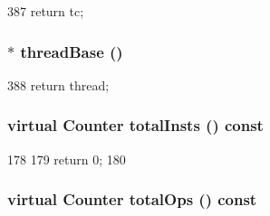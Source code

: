 \begin{DoxyCode}
387 { return tc; }
\end{DoxyCode}
\hypertarget{classCheckerCPU_aed48fbbf4ee8e6fbb3ea13b1bbc23e2d}{
\subsubsection[{threadBase}]{$\ast$ threadBase ()}}
\label{classCheckerCPU_aed48fbbf4ee8e6fbb3ea13b1bbc23e2d}



\begin{DoxyCode}
388 { return thread; }
\end{DoxyCode}
\hypertarget{classCheckerCPU_abdcc0de01ff3d8d22a40e0b966acb463}{
\subsubsection[{totalInsts}]{\setlength{\rightskip}{0pt plus 5cm}virtual {\bf Counter} totalInsts () const}}
\label{classCheckerCPU_abdcc0de01ff3d8d22a40e0b966acb463}



\begin{DoxyCode}
178     {
179         return 0;
180     }
\end{DoxyCode}
\hypertarget{classCheckerCPU_adfb528b512cf037ade8dc8e22bf8a7bd}{
\subsubsection[{totalOps}]{\setlength{\rightskip}{0pt plus 5cm}virtual {\bf Counter} totalOps () const}}
\label{classCheckerCPU_adfb528b512cf037ade8dc8e22bf8a7bd}



